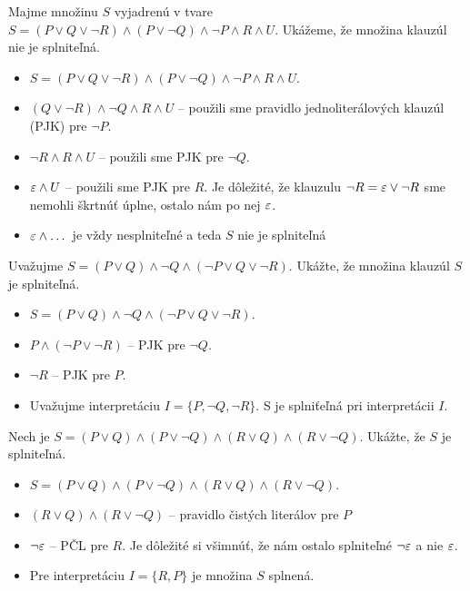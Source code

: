 \begin{priklad}
    Majme množinu $S$ vyjadrenú v tvare
    $S=(P \lor Q \lor \neg R) \land (P \lor \neg Q) 
        \land \neg P \land R \land U$.
    Ukážeme, že množina klauzúl nie je splniteľná.

    \begin{itemize}
    \item $S=(P \lor Q \lor \neg R) \land (P \lor \neg Q) 
            \land \neg P \land R \land U$.

    \item $(Q \lor \neg R) \land  \neg Q \land R \land U$ -- použili
        sme pravidlo jednoliterálových klauzúl (PJK) pre $\neg P$.

    \item $\neg R \land R \land U$ -- použili
        sme PJK pre $\neg Q$.

    \item $\varepsilon \land U$ -- použili
        sme PJK pre $R$. Je dôležité,
        že klauzulu $\neg R = \varepsilon \lor \neg R$ 
        sme nemohli škrtnúť úplne, ostalo nám po nej $\varepsilon$.

    \item $\varepsilon \land \dots$ je vždy nesplniteľné a teda $S$ nie je
        splniteľná
    \end{itemize}
\end{priklad}

\begin{priklad}
    Uvažujme $S=(P \lor Q) \land \neg Q \land ( \neg P \lor Q \lor \neg R)$.
    Ukážte, že množina klauzúl $S$ je splniteľná.

    \begin{itemize}
    \item $S=(P \lor Q) \land \neg Q \land ( \neg P \lor Q \lor \neg R)$.
    \item $P \land (\neg P \lor \neg R)$ -- PJK pre $\neg Q$.
    \item $\neg R$ -- PJK pre $P$.
    \item Uvažujme interpretáciu $I=\{P,\neg Q,\neg R\}$. S je
        splniťeľná pri interpretácii $I$.
    \end{itemize}
\end{priklad}

\begin{priklad}
    Nech je $S=(P \lor Q) \land (P \lor \neg Q) \land
        (R \lor Q) \land (R \lor \neg Q)$.
    Ukážte, že $S$ je splniteľná.

    \begin{itemize}
    \item $S=(P \lor Q) \land (P \lor \neg Q) \land
            (R \lor Q) \land (R \lor \neg Q)$.
    
    \item $(R \lor Q) \land (R \lor \neg Q)$ -- pravidlo čistých
    literálov pre $P$

    \item $\neg \varepsilon$ -- PČL pre $R$. Je dôležité si všimnúť, že nám
        ostalo splniteľné $\neg \varepsilon$ a nie $\varepsilon$.
    \item Pre interpretáciu $I=\{R,P\}$ je množina $S$ splnená.
    \end{itemize}
\end{priklad}

